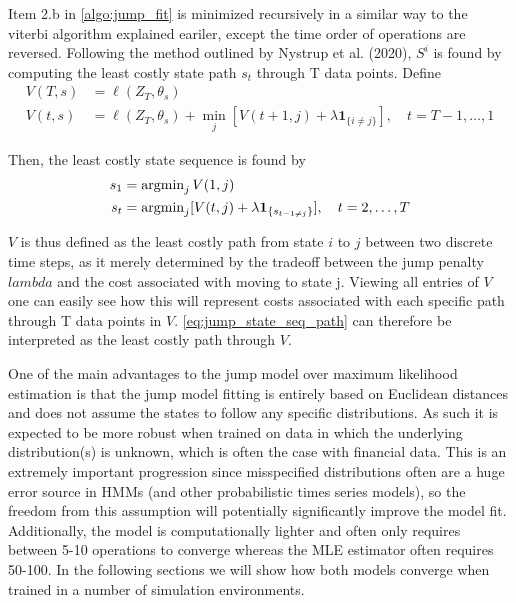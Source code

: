 Item 2.b in \cref{algo:jump_fit} is minimized recursively in a similar way to the viterbi algorithm explained eariler, except the time order of operations are reversed. Following the method outlined by Nystrup et al. (2020), $S^i$ is found by computing the least costly state path $s_t$ through T data points. Define
\begin{align}
    V(T,s) &= \ell(Z_T, \theta_s) \\
    V(t,s) &= \ell(Z_T, \theta_s) + \min_j[V(t+1, j) + \lambda\mathbf{1}_{\{ i\ne j \}}],
    \quad t=T-1,\ldots,1
\label{eq:jump_cost_path}
\end{align}

Then, the least costly state sequence is found by
\begin{align}
    s_1 &= \operatorname{argmin}_j V(1, j) \\
    s_t &= \operatorname{argmin}_j[V(t, j) + \lambda\mathbf{1}_{\{ s_{t-1 \ne j} \}}], \quad t=2,\ldots,T
    \label{eq:jump_state_seq_path}
\end{align}

$V$ is thus defined as the least costly path from state $i$ to $j$ between two discrete time steps, as it merely determined by the tradeoff between the jump penalty $lambda$ and the cost associated with moving to state j. Viewing all entries of $V$ one can easily see how this will represent costs associated with each specific path through T data points in $V$. \cref{eq:jump_state_seq_path} can therefore be interpreted as the least costly path through $V$. 

One of the main advantages to the jump model over maximum likelihood estimation is that the jump model fitting is entirely based on Euclidean distances and does not assume the states to follow any specific distributions. As such it is expected to be more robust when trained on data in which the underlying distribution(s) is unknown, which is often the case with financial data. This is an extremely important progression since misspecified distributions often are a huge error source in HMMs (and other probabilistic times series models), so the freedom from this assumption will potentially significantly improve the model fit. Additionally, the model is computationally lighter and often only requires between 5-10 operations to converge whereas the MLE estimator often requires 50-100. In the following sections we will show how both models converge when trained in a number of simulation environments.